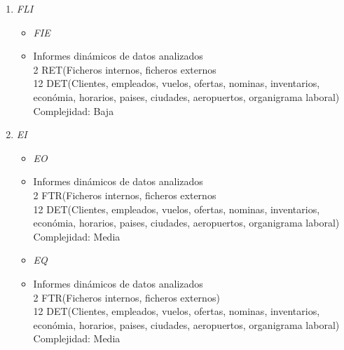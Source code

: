 
		\begin{enumerate}
			\item \textit{FLI}
			\begin{itemize}
			\item \textit{FIE}
				\item Informes dinámicos de datos analizados \\
					2 RET(Ficheros internos, ficheros externos \\
					12 DET(Clientes, empleados, vuelos, ofertas, nominas, inventarios, económia, horarios, paises, ciudades, aeropuertos, organigrama laboral) \\
					Complejidad: Baja\\

			\end{itemize}
			
			\item \textit{EI}
			
			\begin{itemize}
			\item \textit{EO}
				\item Informes dinámicos de datos analizados \\
					2 FTR(Ficheros internos, ficheros externos \\
					12 DET(Clientes, empleados, vuelos, ofertas, nominas, inventarios, económia, horarios, paises, ciudades, aeropuertos, organigrama laboral) \\
					Complejidad: Media\\
			\end{itemize}
			\begin{itemize}
			\item \textit{EQ}
				\item Informes dinámicos de datos analizados \\
					2 FTR(Ficheros internos, ficheros externos) \\
					12 DET(Clientes, empleados, vuelos, ofertas, nominas, inventarios, económia, horarios, paises, ciudades, aeropuertos, organigrama laboral) \\
					Complejidad: Media\\
				
			\end{itemize}		
		\end{enumerate}
		